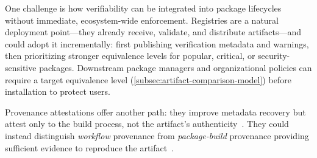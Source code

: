 One challenge is how verifiability can be integrated into package lifecycles without immediate, ecosystem-wide enforcement. 
Registries are a natural deployment point---they already receive, validate, and distribute artifacts---and could adopt it incrementally: first publishing verification metadata and warnings, then prioritizing stronger equivalence levels for popular, critical, or security-sensitive packages. Downstream package managers and organizational policies can require a target equivalence level (\cref{subsec:artifact-comparison-model}) before installation to protect users.

Provenance attestations offer another path: they improve metadata recovery but attest only to the build process, not the artifact's authenticity~\cite{openssf_introducing_nodate}. They could instead distinguish \emph{workflow} provenance from \emph{package-build} provenance providing sufficient evidence to reproduce the artifact~\cite{noauthor_build_nodate}.






